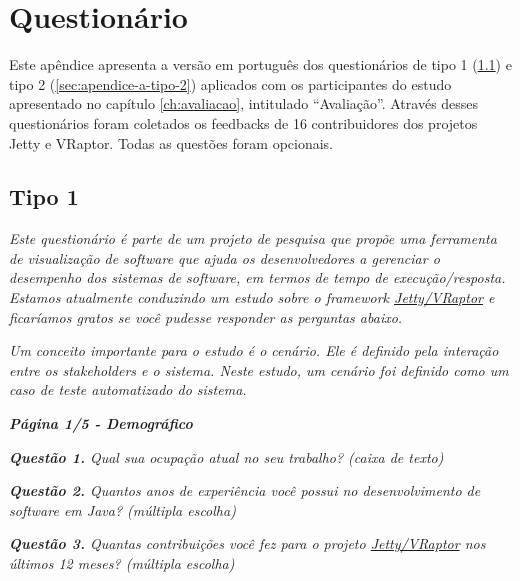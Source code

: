 \apendice
\chapter{Questionário} \label{ch:apendice-a}

Este apêndice apresenta a versão em português dos questionários de tipo 1 (\ref{sec:apendice-a-tipo-1}) e tipo 2 (\ref{sec:apendice-a-tipo-2}) aplicados com os participantes do estudo apresentado no capítulo \ref{ch:avaliacao}, intitulado ``Avaliação''. Através desses questionários foram coletados os feedbacks de 16 contribuidores dos projetos Jetty e VRaptor. Todas as questões foram opcionais.

\section{Tipo 1} \label{sec:apendice-a-tipo-1}

\begin{framed}
  \noindent \textit{\textbf{\toolName}}
  \par
  \par
  \noindent \textit{Este questionário é parte de um projeto de pesquisa que propõe uma ferramenta de visualização de software que ajuda os desenvolvedores a gerenciar o desempenho dos sistemas de software, em termos de tempo de execução/resposta. Estamos atualmente conduzindo um estudo sobre o framework \underline{Jetty/VRaptor} e ficaríamos gratos se você pudesse responder as perguntas abaixo.}
  \par
  \noindent \textit{Um conceito importante para o estudo é o cenário. Ele é definido pela interação entre os stakeholders e o sistema. Neste estudo, um cenário foi definido como um caso de teste automatizado do sistema.}
\end{framed}
	
\begin{framed}
	\noindent \textit{\textbf{Página 1/5 - Demográfico}}
	\par
	\noindent \textit{\textbf{Questão 1.} Qual sua ocupação atual no seu trabalho? (caixa de texto)}
	\par
	\noindent \textit{\textbf{Questão 2.} Quantos anos de experiência você possui no desenvolvimento de software em Java? (múltipla escolha)}
	\par
	\noindent \textit{\textbf{Questão 3.} Quantas contribuições você fez para o projeto \underline{Jetty/VRaptor} nos últimos 12 meses? (múltipla escolha)}
\end{framed}

